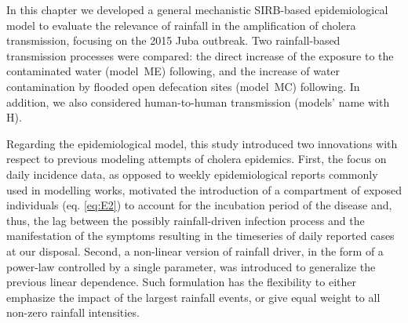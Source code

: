 In this chapter we developed a general mechanistic SIRB-based epidemiological model to evaluate the relevance of rainfall in the amplification of cholera transmission, focusing on the 2015 Juba outbreak. Two rainfall-based transmission processes were compared: the direct increase of the exposure to the contaminated water (model~\textsc{ME}) following\cite{Eisenberg:ExaminingRainfallCholera:2013}, and the increase of water contamination by flooded open defecation sites (model~\textsc{MC}) following\cite{Rinaldo:Reassessment20102011:2012}. In addition, we also considered human-to-human transmission (models' name with \textsc{H}).

Regarding the epidemiological model, this study introduced two innovations with respect to previous modeling attempts of cholera epidemics\cite{Bertuzzo:ProbabilityExtinctionHaiti:2016,Pasetto:RealtimeProjectionsCholera:2017}. First, the focus on daily incidence data, as opposed to weekly epidemiological reports commonly used in modelling works, motivated the introduction of a compartment of exposed individuals (eq. \ref{eq:E2}) to account for the incubation period of the disease and, thus, the lag between the possibly rainfall-driven infection process and the manifestation of the symptoms resulting in the timeseries of daily reported cases at our disposal. %
Second, a non-linear version of rainfall driver, in the form of a power-law controlled by a single parameter, was introduced to generalize the previous linear dependence. Such formulation has the flexibility to either emphasize the impact of the largest rainfall events, or give equal weight to all non-zero rainfall intensities. %

